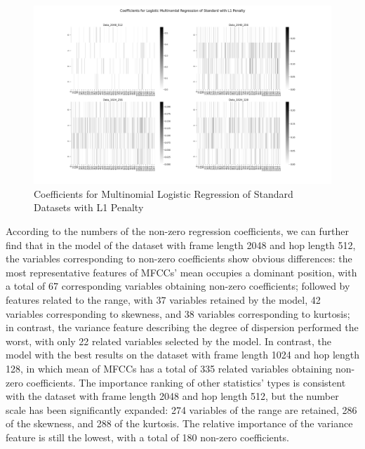 \begin{figure}[H]
	\centering
	\includegraphics[width=0.9\linewidth]{../Statistical_Sciences_template/figure/Coefficients for Logistic Multinomial Regression of Standard with L1 Penalty.png}
	\caption{Coefficients for Multinomial Logistic Regression of Standard Datasets with L1 Penalty}
	\label{fig:MLRstdcoef}
\end{figure}
\noindent According to the numbers of the non-zero regression coefficients, we can further find that in the model of the dataset with frame length 2048 and hop length 512, the variables corresponding to non-zero coefficients show obvious differences: the most representative features of MFCCs' mean occupies a dominant position, with a total of 67 corresponding variables obtaining non-zero coefficients; followed by features related to the range, with 37 variables retained by the model, 42 variables corresponding to skewness, and 38 variables corresponding to kurtosis; in contrast, the variance feature describing the degree of dispersion performed the worst, with only 22 related variables selected by the model. In contrast, the model with the best results on the dataset with frame length 1024 and hop length 128, in which mean of MFCCs has a total of 335 related variables obtaining non-zero coefficients. The importance ranking of other statistics' types is consistent with the dataset with frame length 2048 and hop length 512, but the number scale has been significantly expanded: 274 variables of the range are retained, 286 of the skewness, and 288 of the kurtosis. The relative importance of the variance feature is still the lowest, with a total of 180 non-zero coefficients.\\
\\
